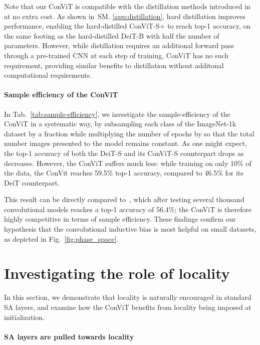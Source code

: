 Note that our ConViT is compatible with the distillation methods introduced in~\citet{touvron2020training} at no extra cost. As shown in~SM. \ref{app:distillation}, hard distillation improves performance, enabling the hard-distilled ConViT-S+ to reach  top-1 accuracy, on the same footing as the hard-distilled DeiT-B with half the number of parameters. However, while distillation requires an additional forward pass through a pre-trained CNN at each step of training, ConViT has no such requirement, providing similar benefits to distillation without additonal computational requirements. 

\paragraph{Sample efficiency of the ConViT}

In Tab.~\ref{tab:sample-efficiency}, we investigate the sample-efficiency of the ConViT in a systematic way, by subsampling each class of the ImageNet-1k dataset by a fraction  while multiplying the number of epochs by  so that the total number images presented to the model remains constant. As one might expect, the top-1 accuracy of both the DeiT-S and its ConViT-S counterpart drops as  decreases. However, the ConViT suffers much less: while training on only 10\% of the data, the ConVit reaches 59.5\% top-1 accuracy, compared to 46.5\% for its DeiT counterpart.

This result can be directly compared to~\cite{zhai2019s4l}, which after testing several thousand convolutional models reaches a top-1 accuracy of 56.4\%; the ConViT is therefore highly competitive in terms of sample efficiency. These findings confirm our hypothesis that the convolutional inductive bias is most helpful on small datasets, as depicted in Fig.~\ref{fig:phase_space}.

\section{Investigating the role of locality}
\label{sec:experimental}

In this section, we demonstrate that locality is naturally encouraged in standard SA layers, and examine how the ConViT benefits from locality being imposed at initialization.

\paragraph{SA layers are pulled towards locality}

